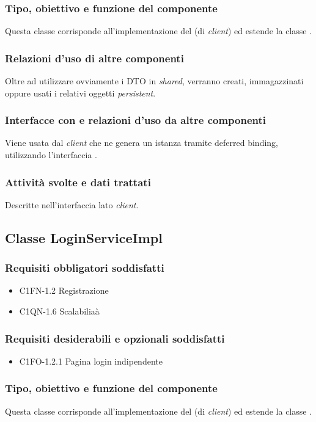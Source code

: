 \subsubsection*{Tipo, obiettivo e funzione del componente}
Questa classe corrisponde all'implementazione del  (di
\emph{client}) ed estende la classe .
\subsubsection*{Relazioni d'uso di altre componenti}
Oltre ad utilizzare ovviamente i DTO in \emph{shared}, verranno creati,
immagazzinati oppure usati i relativi oggetti \emph{persistent}.
\subsubsection*{Interfacce con e relazioni d'uso da altre componenti}
Viene usata dal \emph{client} che ne genera un istanza tramite deferred binding,
utilizzando l'interfaccia .
\subsubsection*{Attivit\`a svolte e dati trattati}
Descritte nell'interfaccia lato \emph{client}.


\subsection{Classe LoginServiceImpl}
\subsubsection*{Requisiti obbligatori soddisfatti}
\begin{itemize}
    \item C1FN-1.2 Registrazione
    \item C1QN-1.6 Scalabilia\`a
\end{itemize}
\subsubsection*{Requisiti desiderabili e opzionali soddisfatti}
\begin{itemize}
    \item C1FO-1.2.1 Pagina login indipendente
\end{itemize}
\subsubsection*{Tipo, obiettivo e funzione del componente}
Questa classe corrisponde all'implementazione del  (di
\emph{client}) ed estende la classe .
